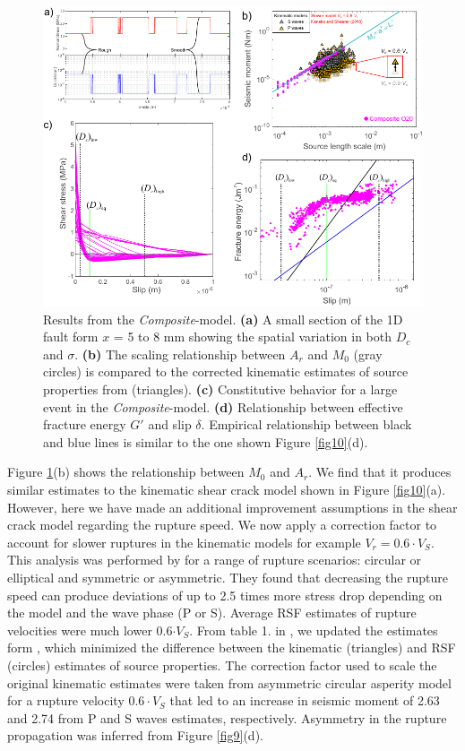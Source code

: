 \documentclass[preprint,1p, 10pt,authoryear]{elsarticle}
\begin{document}
\begin{figure}
	\centering
	\includegraphics{FIG12_revised.pdf} 
	\caption{Results from the \textit{Composite}-model. \textbf{(a)} A small section of the 1D fault form $x$ = 5 to 8 mm showing the spatial variation in both $D_{c}$ and $\sigma$. \textbf{(b)} The scaling relationship between $A_{r}$ and $M_{0}$ (gray circles) is compared to the corrected kinematic estimates of source properties from \citet{Selvadurai2019} (triangles).   \textbf{(c)} Constitutive behavior for a large event in the \textit{Composite}-model. \textbf{(d)} Relationship between effective fracture energy $G'$ and slip $\delta$. Empirical relationship between black and blue lines is similar to the one shown Figure \ref{fig10}(d).}
	\label{fig12}
\end{figure}

Figure \ref{fig12}(b) shows the relationship between $M_{0}$ and $A_{r}$. We find that it produces similar estimates to the kinematic shear crack model shown in Figure \ref{fig10}(a). However, here we have made an additional improvement assumptions in the shear crack model regarding the rupture speed.  We now apply a correction factor to account for slower ruptures in the kinematic models for example $V_{r} = 0.6\cdot V_{S}$.  This analysis was performed by \citet{Kaneko2015} for a range of rupture scenarios: circular or elliptical and symmetric or asymmetric.  They found that decreasing the rupture speed can produce deviations of up to 2.5 times more stress drop depending on the model and the wave phase (P or S).  Average RSF estimates of rupture velocities were much lower 0.6$\cdot V_{S}$.  From table 1. in \citet{Kaneko2015}, we updated the estimates form \citet{Selvadurai2019}, which minimized the difference between the kinematic (triangles) and RSF (circles) estimates of source properties.  The correction factor used to scale the original kinematic estimates were taken from asymmetric circular asperity model for a rupture velocity $0.6\cdot V_{S}$ that led to an increase in seismic moment of 2.63 and 2.74 from P and S waves estimates, respectively.  Asymmetry in the rupture propagation was inferred from Figure \ref{fig9}(d).
\end{document}
